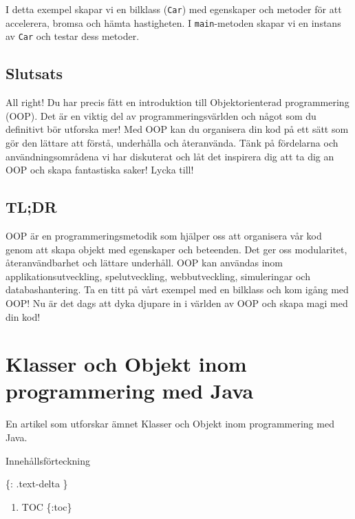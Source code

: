 I detta exempel skapar vi en bilklass (\texttt{Car}) med egenskaper och
metoder för att accelerera, bromsa och hämta hastigheten. I
\texttt{main}-metoden skapar vi en instans av \texttt{Car} och testar
dess metoder.

\hypertarget{slutsats}{%
\subsection{Slutsats}\label{slutsats}}

All right! Du har precis fått en introduktion till Objektorienterad
programmering (OOP). Det är en viktig del av programmeringsvärlden och
något som du definitivt bör utforska mer! Med OOP kan du organisera din
kod på ett sätt som gör den lättare att förstå, underhålla och
återanvända. Tänk på fördelarna och användningsområdena vi har
diskuterat och låt det inspirera dig att ta dig an OOP och skapa
fantastiska saker! Lycka till!

\hypertarget{tldr}{%
\subsection{TL;DR}\label{tldr}}

OOP är en programmeringsmetodik som hjälper oss att organisera vår kod
genom att skapa objekt med egenskaper och beteenden. Det ger oss
modularitet, återanvändbarhet och lättare underhåll. OOP kan användas
inom applikationsutveckling, spelutveckling, webbutveckling,
simuleringar och databashantering. Ta en titt på vårt exempel med en
bilklass och kom igång med OOP! Nu är det dags att dyka djupare in i
världen av OOP och skapa magi med din kod!

\hypertarget{klasser-och-objekt-inom-programmering-med-java}{%
\section{Klasser och Objekt inom programmering med
Java}\label{klasser-och-objekt-inom-programmering-med-java}}

En artikel som utforskar ämnet Klasser och Objekt inom programmering med
Java.

Innehållsförteckning

\{: .text-delta \}

\begin{enumerate}
\def\labelenumi{\arabic{enumi}.}
\tightlist
\item
  TOC \{:toc\}
\end{enumerate}

